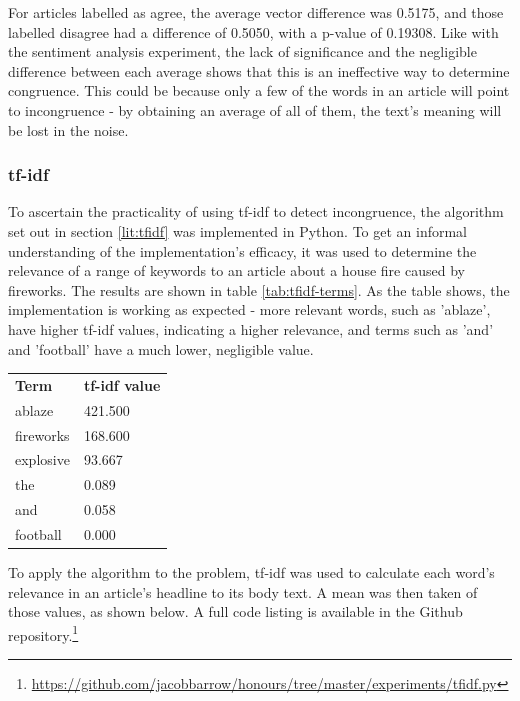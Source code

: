For articles labelled as agree, the average vector difference was 0.5175, and those labelled disagree had a difference of 0.5050, with a p-value of 0.19308. Like with the sentiment analysis experiment, the lack of significance and the negligible difference between each average shows that this is an ineffective way to determine congruence. This could be because only a few of the words in an article will point to incongruence - by obtaining an average of all of them, the text's meaning will be lost in the noise.

\subsubsection{tf-idf}

\begin{minipage}{0.65\linewidth}
To ascertain the practicality of using tf-idf to detect incongruence, the algorithm set out in section \ref{lit:tfidf} was implemented in Python. To get an informal understanding of the implementation's efficacy, it was used to determine the relevance of a range of keywords to an article about a house fire caused by fireworks. The results are shown in table \ref{tab:tfidf-terms}. As the table shows, the implementation is working as expected - more relevant words, such as 'ablaze', have higher tf-idf values, indicating a higher relevance, and terms such as 'and' and 'football' have a much lower, negligible value.
\\
\end{minipage}
\hspace{5mm}
\begin{minipage}{0.3\linewidth}
\vspace{-2mm}
\begin{tabular}{ll}
\textbf{Term} & \textbf{tf-idf value} \\
ablaze & 421.500 \\
fireworks & 168.600 \\
explosive & 93.667 \\
the & 0.089 \\
and & 0.058 \\
football & 0.000
\end{tabular}
\label{tab:tfidf-terms}
\end{minipage}

To apply the algorithm to the problem, tf-idf was used to calculate each word's relevance in an article's headline to its body text. A mean was then taken of those values, as shown below. A full code listing is available in the Github repository.\footnote{\url{https://github.com/jacobbarrow/honours/tree/master/experiments/tfidf.py}}


